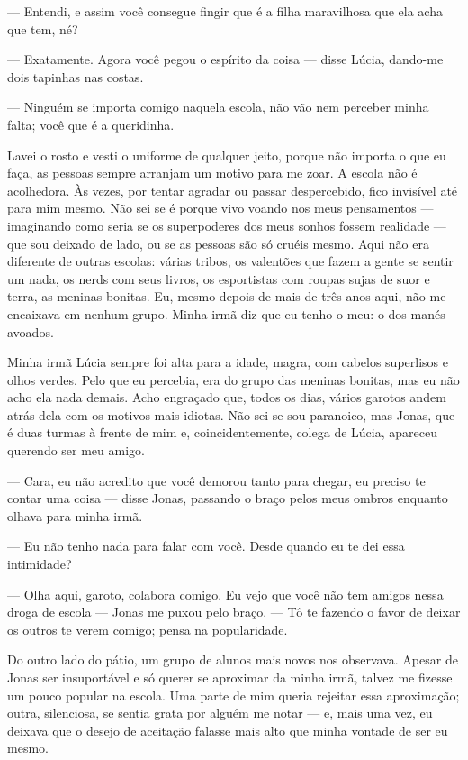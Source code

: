 — Entendi, e assim você consegue fingir que é a filha maravilhosa que ela acha que tem, né?

— Exatamente. Agora você pegou o espírito da coisa — disse Lúcia, dando-me dois tapinhas nas costas.

— Ninguém se importa comigo naquela escola, não vão nem perceber minha falta; você que é a queridinha.

Lavei o rosto e vesti o uniforme de qualquer jeito, porque não importa o que eu faça, as pessoas sempre arranjam um motivo para me zoar. A escola não é acolhedora. Às vezes, por tentar agradar ou passar despercebido, fico invisível até para mim mesmo. Não sei se é porque vivo voando nos meus pensamentos — imaginando como seria se os superpoderes dos meus sonhos fossem realidade — que sou deixado de lado, ou se as pessoas são só cruéis mesmo. Aqui não era diferente de outras escolas: várias tribos, os valentões que fazem a gente se sentir um nada, os nerds com seus livros, os esportistas com roupas sujas de suor e terra, as meninas bonitas. Eu, mesmo depois de mais de três anos aqui, não me encaixava em nenhum grupo. Minha irmã diz que eu tenho o meu: o dos manés avoados.

Minha irmã Lúcia sempre foi alta para a idade, magra, com cabelos superlisos e olhos verdes. Pelo que eu percebia, era do grupo das meninas bonitas, mas eu não acho ela nada demais. Acho engraçado que, todos os dias, vários garotos andem atrás dela com os motivos mais idiotas. Não sei se sou paranoico, mas Jonas, que é duas turmas à frente de mim e, coincidentemente, colega de Lúcia, apareceu querendo ser meu amigo.

— Cara, eu não acredito que você demorou tanto para chegar, eu preciso te contar uma coisa — disse Jonas, passando o braço pelos meus ombros enquanto olhava para minha irmã.

— Eu não tenho nada para falar com você. Desde quando eu te dei essa intimidade?

— Olha aqui, garoto, colabora comigo. Eu vejo que você não tem amigos nessa droga de escola — Jonas me puxou pelo braço. — Tô te fazendo o favor de deixar os outros te verem comigo; pensa na popularidade.

Do outro lado do pátio, um grupo de alunos mais novos nos observava. Apesar de Jonas ser insuportável e só querer se aproximar da minha irmã, talvez me fizesse um pouco popular na escola. Uma parte de mim queria rejeitar essa aproximação; outra, silenciosa, se sentia grata por alguém me notar — e, mais uma vez, eu deixava que o desejo de aceitação falasse mais alto que minha vontade de ser eu mesmo.

